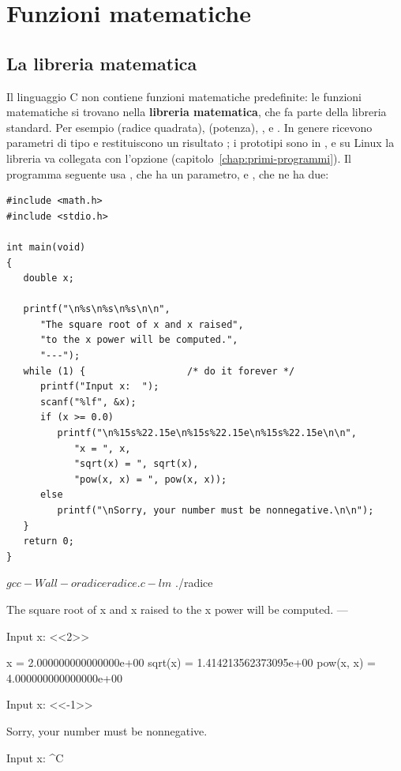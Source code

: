 \section{Funzioni matematiche}

\subsection{La libreria matematica}

Il linguaggio C non contiene funzioni matematiche predefinite: le funzioni
matematiche si trovano nella \textbf{libreria matematica}, che fa parte della
libreria standard. Per esempio  (radice quadrata), 
(potenza), ,  e . In genere ricevono parametri
di tipo  e restituiscono un risultato ; i
prototipi sono in , e su Linux la libreria va collegata con
l'opzione  (capitolo~\ref{chap:primi-programmi}). Il programma
seguente usa , che ha un parametro, e , che ne ha due:

\begin{affianco}[0.56][t]
\codicepiccolo
\begin{lstlisting}[style=c, name=radice.c]
#include <math.h>
#include <stdio.h>

int main(void)
{
   double x;

   printf("\n%s\n%s\n%s\n\n",
      "The square root of x and x raised",
      "to the x power will be computed.",
      "---");
   while (1) {                  /* do it forever */
      printf("Input x:  ");
      scanf("%lf", &x);
      if (x >= 0.0)
         printf("\n%15s%22.15e\n%15s%22.15e\n%15s%22.15e\n\n",
            "x = ", x,
            "sqrt(x) = ", sqrt(x),
            "pow(x, x) = ", pow(x, x));
      else
         printf("\nSorry, your number must be nonnegative.\n\n");
   }
   return 0;
}
\end{lstlisting}
\risultato
\begin{console}
$ gcc -Wall -o radice radice.c -lm
$ ./radice

The square root of x and x raised
to the x power will be computed.
---

Input x:  <<2>>

           x =  2.000000000000000e+00
     sqrt(x) =  1.414213562373095e+00
   pow(x, x) =  4.000000000000000e+00

Input x:  <<-1>>

Sorry, your number must be nonnegative.

Input x:  ^C
\end{console}
\end{affianco}

